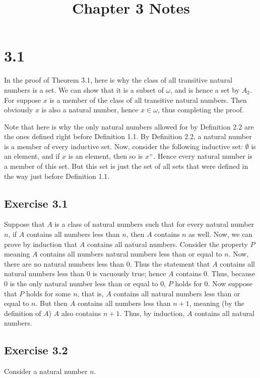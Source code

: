 \documentclass{article}
\title{Chapter 3 Notes}
\theoremstyle{definition}
\begin{document}
\date{}
\maketitle

\section*{3.1}
In the proof of Theorem 3.1, here is why the class of all transitive natural numbers is a set. We can show that it is a subset of $\omega$, and is hence a set by $A_2$. For suppose $x$ is a 
member of the class of all transitive natural numbers. Then obviously $x$ is also a natural number, hence $x\in\omega$, thus completing the proof. 


Note that here is why the only natural numbers allowed for by Definition 2.2 are the ones defined right before Definition 1.1. By Definition 2.2, a natural number is a member of every 
inductive set. Now, consider the following inductive set: $\emptyset$ is an element, and if $x$ is an element, then so is $x^+$. Hence every natural number is a member of this set. But 
this set is just the set of all sets that were defined in the way just before Definition 1.1.

\subsection*{Exercise 3.1}
Suppose that $A$ is a class of natural numbers such that for every natural number $n$, if $A$ contains all numbers less than $n$, then $A$ contains $n$ as well. Now, we can prove by induction that 
$A$ contains all natural numbers. Consider the property $P$ meaning $A$ contains all numbers natural numbers less than or equal to $n$. Now, there are no natural numbers less than 0. Thus 
the statement that $A$ contains all natural numbers less than 0 is vacuously true; hence $A$ contains 0. Thus, because $0$ is the only natural number less than or equal to 0, $P$ holds for 
$0$. Now suppose that $P$ holds for some $n$, that is, $A$ contains all natural numbers less than or equal to $n$. But then $A$ contains all numbers less than $n+1$, meaning (by the definition of 
$A$) $A$ also contains $n+1$. Thus, by induction, $A$ contains all natural numbers.

\subsection*{Exercise 3.2}
Consider a natural number $n$.
\end{document}
